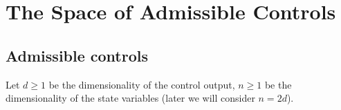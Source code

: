 \documentclass[11pt]{article}
\theoremstyle{plain}
\theoremstyle{definition}
\newtheorem{remark}[theorem]{Remark}
\theoremstyle{remark}
\numberwithin{equation}{section}
\newcommand{\supp}{{\rm supp}}
\newcommand{\diam}{{\rm diam}}
\begin{document}
\section{The Space of Admissible Controls}

\subsection{Admissible controls}

Let $d \geq 1$ be the dimensionality of the control output, $n \geq 1$ be the dimensionality of the state variables (later we will consider $n=2d$). 

\end{document}
